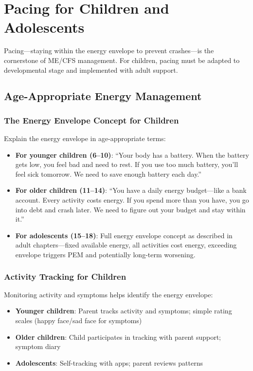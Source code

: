 \section{Pacing for Children and Adolescents}
\label{sec:ped-pacing}

Pacing---staying within the energy envelope to prevent crashes---is the cornerstone of ME/CFS management. For children, pacing must be adapted to developmental stage and implemented with adult support.

\subsection{Age-Appropriate Energy Management}
\label{subsec:ped-energy-management}

\subsubsection{The Energy Envelope Concept for Children}

Explain the energy envelope in age-appropriate terms:

\begin{itemize}
    \item \textbf{For younger children (6--10)}: ``Your body has a battery. When the battery gets low, you feel bad and need to rest. If you use too much battery, you'll feel sick tomorrow. We need to save enough battery each day.''

    \item \textbf{For older children (11--14)}: ``You have a daily energy budget---like a bank account. Every activity costs energy. If you spend more than you have, you go into debt and crash later. We need to figure out your budget and stay within it.''

    \item \textbf{For adolescents (15--18)}: Full energy envelope concept as described in adult chapters---fixed available energy, all activities cost energy, exceeding envelope triggers PEM and potentially long-term worsening.
\end{itemize}

\subsubsection{Activity Tracking for Children}

Monitoring activity and symptoms helps identify the energy envelope:

\begin{itemize}
    \item \textbf{Younger children}: Parent tracks activity and symptoms; simple rating scales (happy face/sad face for symptoms)
    \item \textbf{Older children}: Child participates in tracking with parent support; symptom diary
    \item \textbf{Adolescents}: Self-tracking with apps; parent reviews patterns
\end{itemize}

